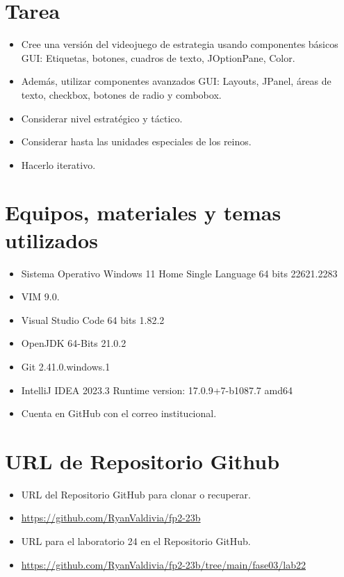 \documentclass{article}
\begin{document}
	\section{Tarea}
	\begin{itemize}
			\item Cree una versión del videojuego de estrategia usando componentes básicos GUI: Etiquetas, botones,
cuadros de texto, JOptionPane, Color.
			\item Además, utilizar componentes avanzados GUI: Layouts, JPanel, áreas de texto, checkbox, botones de
radio y combobox.
			\item Considerar nivel estratégico y táctico.
			\item Considerar hasta las unidades especiales de los reinos.
			\item Hacerlo iterativo.
	\end{itemize}
		
	\section{Equipos, materiales y temas utilizados}
	\begin{itemize}
		\item Sistema Operativo Windows 11 Home Single Language 64 bits 22621.2283
		\item VIM 9.0.
		\item Visual Studio Code 64 bits 1.82.2
		\item OpenJDK 64-Bits 21.0.2
		\item Git 2.41.0.windows.1
		\item IntelliJ IDEA 2023.3 Runtime version: 17.0.9+7-b1087.7 amd64
		\item Cuenta en GitHub con el correo institucional. 
	\end{itemize}
	
	\section{URL de Repositorio Github}
	\begin{itemize}
		\item URL del Repositorio GitHub para clonar o recuperar.
		\item \url{https://github.com/RyanValdivia/fp2-23b}
		\item URL para el laboratorio 24 en el Repositorio GitHub.
		\item \url{https://github.com/RyanValdivia/fp2-23b/tree/main/fase03/lab22}
	\end{itemize}
	
\end{document}
